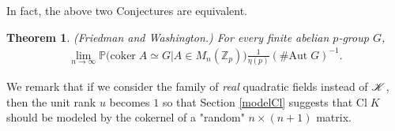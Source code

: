 \documentclass[12pt,reqno]{amsart}
\newtheorem{thm}{Theorem}[section]
\numberwithin{equation}{section}
\def\Z{{\mathbb Z}}
\def\P{{\mathbb P}}
\begin{document}
In fact, the above two Conjectures are equivalent.

\begin{thm}{\rm (Friedman and Washington.)} For every finite abelian $p$-group $G$,
\begin{align*}
\lim_{n \to \infty} \P\big( \text{coker} \; A \simeq G | A \in M_n(\Z_p)\big) \frac{1}{\eta(p)} (\# \text{Aut} \; G)^{-1}.
\end{align*}
\end{thm}

We remark that if we consider the family of \textit{real} quadratic fields instead of ${\mathscr K}$, then the unit rank $u$ becomes $1$ so that Section \ref{modelCl} suggests that $\text{Cl} \; K$ should be modeled by the cokernel of a "random" $n \times (n+1)$ matrix.

\end{document}
